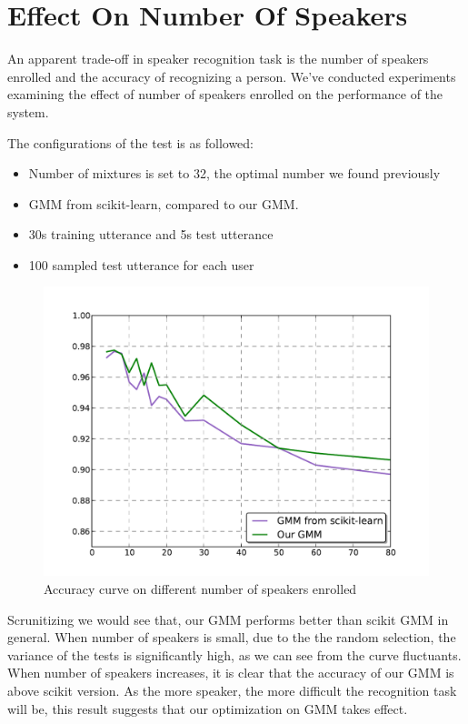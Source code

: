 \section{Effect On Number Of Speakers}
An apparent trade-off in speaker recognition task is the number of speakers
enrolled and the accuracy of recognizing a person. We've conducted experiments
examining the effect of number of speakers enrolled on the performance of the
system.

The configurations of the test is as followed:
\begin{itemize}
	\item Number of mixtures is set to 32, the optimal number we found previously
	\item GMM from scikit-learn, compared to our GMM.
	\item 30s training utterance and 5s test utterance
	\item 100 sampled test utterance for each user
\end{itemize}


\begin{figure}[!ht]
	\label{fig:nspk_enrolled}
	\centering
	\includegraphics[width=\linewidth]{res/nperson.pdf}
	\caption{Accuracy curve on different number of speakers enrolled}
\end{figure}

Scrunitizing  we would see that, our GMM performs better than
scikit GMM in general. When number of speakers is small, due to the the random
selection, the variance of the tests is significantly high, as we can see from the curve fluctuants.
When number of speakers increases, it is clear that the
accuracy of our GMM is above scikit version. As the more speaker, the more
difficult the recognition task will be, this result suggests that our
optimization on GMM takes effect.


